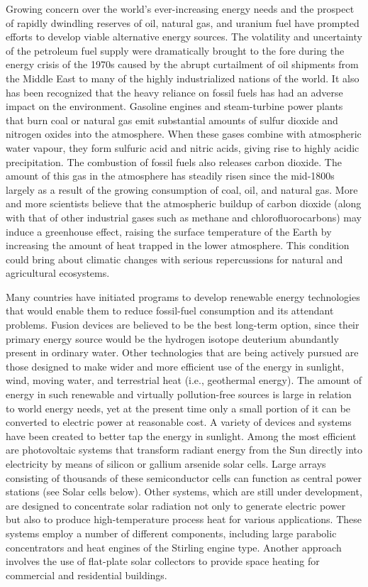 \documentclass[a4paper]{article}
\begin{document}
Growing concern over the world's ever-increasing energy needs and the prospect of rapidly dwindling
reserves of oil, natural gas, and uranium fuel have prompted efforts to develop viable alternative
energy sources. The volatility and uncertainty of the petroleum fuel supply were dramatically
brought to the fore during the energy crisis of the 1970s caused by the abrupt curtailment of oil
shipments from the Middle East to many of the highly industrialized nations of the world. It also
has been recognized that the heavy reliance on fossil fuels has had an adverse impact on the
environment. Gasoline engines and steam-turbine power plants that burn coal or natural gas emit
substantial amounts of sulfur dioxide and nitrogen oxides into the atmosphere. When these gases
combine with atmospheric water vapour, they form sulfuric acid and nitric acids, giving rise to
highly acidic precipitation. The combustion of fossil fuels also releases carbon dioxide. The
amount of this gas in the atmosphere has steadily risen since the mid-1800s largely as a result
of the growing consumption of coal, oil, and natural gas. More and more scientists believe that
the atmospheric buildup of carbon dioxide (along with that of other industrial gases such as
methane and chlorofluorocarbons) may induce a greenhouse effect, raising the surface temperature
of the Earth by increasing the amount of heat trapped in the lower atmosphere. This condition
could bring about climatic changes with serious repercussions for natural and agricultural ecosystems.

Many countries have initiated programs to develop renewable energy technologies that would enable
them to reduce fossil-fuel consumption and its attendant problems. Fusion devices are believed
to be the best long-term option, since their primary energy source would be the hydrogen
isotope deuterium abundantly present in ordinary water. Other technologies that are being
actively pursued are those designed to make wider and more efficient use of the energy
in sunlight, wind, moving water, and terrestrial heat (i.e., geothermal energy). The amount
of energy in such renewable and virtually pollution-free sources is large in relation to world
energy needs, yet at the present time only a small portion of it can be converted to electric
power at reasonable cost. A variety of devices and systems have been created to better tap
the energy in sunlight. Among the most efficient are photovoltaic systems that transform radiant
energy from the Sun directly into electricity by means of silicon or gallium arsenide solar cells.
Large arrays consisting of thousands of these semiconductor cells can function as central power
stations (see Solar cells below). Other systems, which are still under development, are designed
to concentrate solar radiation not only to generate electric power but also to produce
high-temperature process heat for various applications. These systems employ a number of
different components, including large parabolic concentrators and heat engines of the Stirling
engine type. Another approach involves the use of flat-plate solar collectors to provide space
heating for commercial and residential buildings.
\end{document}
